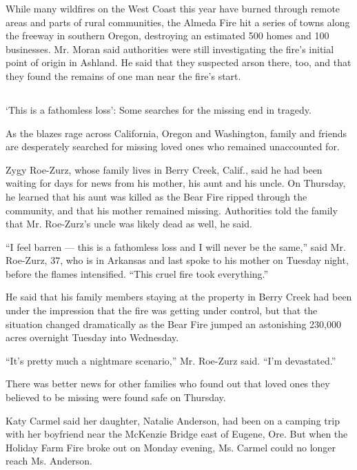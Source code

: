 While many wildfires on the West Coast this year have burned through
remote areas and parts of rural communities, the Almeda Fire hit a
series of towns along the freeway in southern Oregon, destroying an
estimated 500 homes and 100 businesses. Mr. Moran said authorities were
still investigating the fire's initial point of origin in Ashland. He
said that they suspected arson there, too, and that they found the
remains of one man near the fire's start.

\hypertarget{-5}{%
\subsection{}\label{-5}}

`This is a fathomless loss': Some searches for the missing end in
tragedy.

As the blazes rage across California, Oregon and Washington, family and
friends are desperately searched for missing loved ones who remained
unaccounted for.

Zygy Roe-Zurz, whose family lives in Berry Creek, Calif., said he had
been waiting for days for news from his mother, his aunt and his uncle.
On Thursday, he learned that his aunt was killed as the Bear Fire ripped
through the community, and that his mother remained missing. Authorities
told the family that Mr. Roe-Zurz's uncle was likely dead as well, he
said.

``I feel barren --- this is a fathomless loss and I will never be the
same,'' said Mr. Roe-Zurz, 37, who is in Arkansas and last spoke to his
mother on Tuesday night, before the flames intensified. ``This cruel
fire took everything.''

He said that his family members staying at the property in Berry Creek
had been under the impression that the fire was getting under control,
but that the situation changed dramatically as the Bear Fire jumped an
astonishing 230,000 acres overnight Tuesday into Wednesday.

``It's pretty much a nightmare scenario,'' Mr. Roe-Zurz said. ``I'm
devastated.''

There was better news for other families who found out that loved ones
they believed to be missing were found safe on Thursday.

Katy Carmel said her daughter, Natalie Anderson, had been on a camping
trip with her boyfriend near the McKenzie Bridge east of Eugene, Ore.
But when the Holiday Farm Fire broke out on Monday evening, Ms. Carmel
could no longer reach Ms. Anderson.

